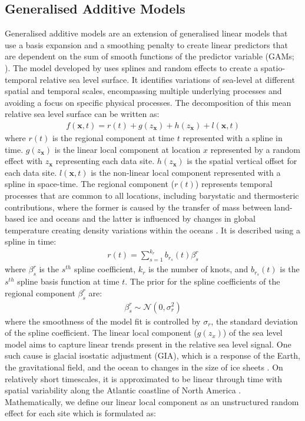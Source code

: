 \subsection{Generalised Additive Models}\label{generalisedadditivemodels}
Generalised additive models are an extension of generalised linear models that use a basis expansion and a smoothing penalty to create linear predictors that are dependent on the sum of smooth functions of the predictor variable (GAMs; \citep{wood_2017}). The model developed by \citet{Upton2023noisy} uses splines and random effects to create a spatio-temporal relative sea level surface. It identifies variations of sea-level at different spatial and temporal scales, encompassing multiple underlying processes and avoiding a focus on specific physical processes. The decomposition of this mean relative sea level surface can be written as:
\begin{align}
f(\mathbf{x},t) =  r(t)+ g(z_\mathbf{x}) + h(z_\mathbf{x}) + l(\mathbf{x},t)
    \end{align}
where \(r(t)\) is the regional component at time \(t\) represented with a spline in time. \(g(z_{\mathbf{x}})\) is the linear local component at location \(x\) represented by a random effect with \(z_{\mathbf{x}}\) representing each data site. \(h(z_\mathbf{x})\) is the spatial vertical offset for each data site. \(l(\mathbf{x},t)\) is the non-linear local component represented with a spline in space-time.
The regional component (\(r(t)\)) represents temporal processes that are common to all locations, including barystatic and thermosteric contributions, where the former is caused by the transfer of mass between land-based ice and oceans \citep{Gregory2019} and the latter is influenced by changes in global temperature creating density variations within the oceans \citep{Grinsted2015}. It is described using a spline in time:
\begin{align}
r(t) = \sum^{k_r}_{s=1} b_{r_s}(t)\beta^{r}_s
\end{align}
where \(\beta^{r}_s\) is the \(s^{th}\) spline coefficient, \(k_r\) is the number of knots, and \(b_{r_s}(t)\) is the \(s^{th}\) spline basis function at time \(t\). The prior for the spline coefficients of the regional component \(\beta^{r}_s\) are:
\begin{align}
  \beta^{r}_s \sim \mathcal{N} ( 0, \sigma_r^2)
\end{align}
where the smoothness of the model fit is controlled by \(\sigma_r\), the standard deviation of the spline coefficient.
The linear local component (\(g(z_x)\)) of the sea level model aims to capture linear trends present in the relative sea level signal. One such cause is glacial isostatic adjustment (GIA), which is a response of the Earth, the gravitational field, and the ocean to changes in the size of ice sheets \citep{Whitehouse2018}. On relatively short timescales, it is approximated to be linear through time with spatial variability along the Atlantic coastline of North America \citep{Engelhart2009}. Mathematically, we define our linear local component as an unstructured random effect for each site which is formulated as:

